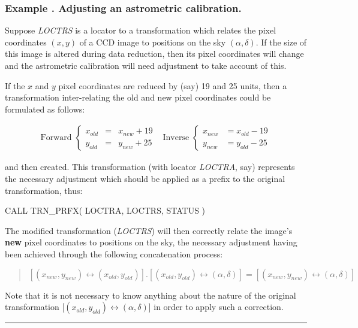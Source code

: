 \documentclass[twoside,nolof,11pt]{starlink}
\providecommand{\name}[1]{\small{#1}}
\providecommand{\fortvar}[1]{\emph{#1}}
\newcounter{examplecounter}
\providecommand{\example}[1]{\addtocounter{examplecounter}{1}
                         \subsubsection*{Example \theexamplecounter. #1}}
\providecommand{\exampledone}[0]{\begin{center} \rule{6em}{0.2mm} \end{center}}
\begin{document}
\example{Adjusting an astrometric calibration.}
Suppose \fortvar{LOCTRS} is a locator to a transformation which relates the
pixel coordinates $(x,y)$ of a \name{CCD} image to positions on the
sky $(\alpha,\delta)$.
If the size of this image is altered during data reduction, then its pixel
coordinates will change and the astrometric calibration will need adjustment
to take account of this.

If the $x$ and $y$ pixel coordinates are reduced by (say) 19 and 25 units,
then a transformation inter-relating the old and new pixel coordinates could
be formulated as follows:

\begin{equation}
\begin{array}{cc}

\mbox{Forward } \left\{
\begin{array}{lll}
x_{old} & = & x_{new} + 19 \\
y_{old} & = & y_{new} + 25
\end{array}
\right.
&
\mbox{Inverse } \left\{
\begin{array}{lll}
x_{new} & = x_{old} - 19 \\
y_{new} & = y_{old} - 25
\end{array}
\right.

\end{array}
\end{equation}

and then created.
This transformation (with locator \fortvar{LOCTRA}, say) represents the
necessary adjustment which should be applied as a prefix to the original
transformation, thus:

\begin{terminalv}
CALL TRN_PRFX( LOCTRA, LOCTRS, STATUS )
\end{terminalv}

The modified transformation (\fortvar{LOCTRS}\/) will then correctly relate
the image's \textbf{new} pixel coordinates to positions on the sky, the
necessary adjustment having been achieved through the following
concatenation process:

\begin{quote}
\begin{center}
$[(x_{new},y_{new}) \leftrightarrow (x_{old},y_{old})].[(x_{old},y_{old})
\leftrightarrow (\alpha,\delta)] = [(x_{new},y_{new}) \leftrightarrow
(\alpha,\delta)]$
\end{center}
\end{quote}

Note that it is not necessary to know anything about the nature of the
original transformation \mbox{[$(x_{old},y_{old}) \leftrightarrow
(\alpha,\delta)$]} in order to apply such a correction.
\exampledone
\end{document}
